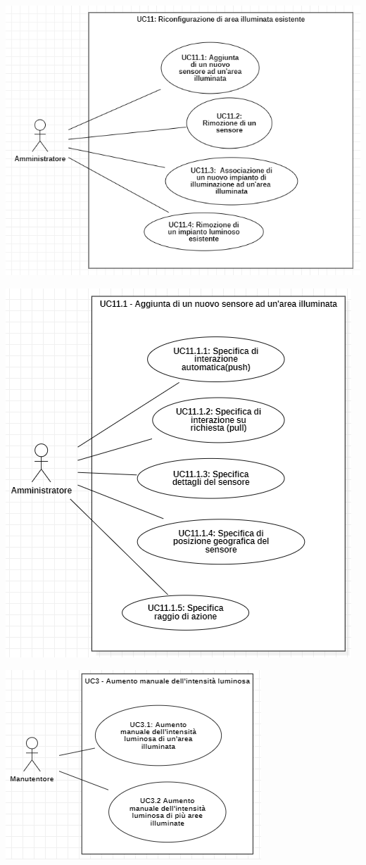 \documentclass[a4paper, 12pt]{article}
\begin{document}
\includegraphics[scale=0.7]{diagramma_use_case_4.png}

\includegraphics[scale=0.7]{diagramma_use_case_5.png}

\includegraphics[scale=0.60]{diagramma_use_case_6.png}
\end{document}
